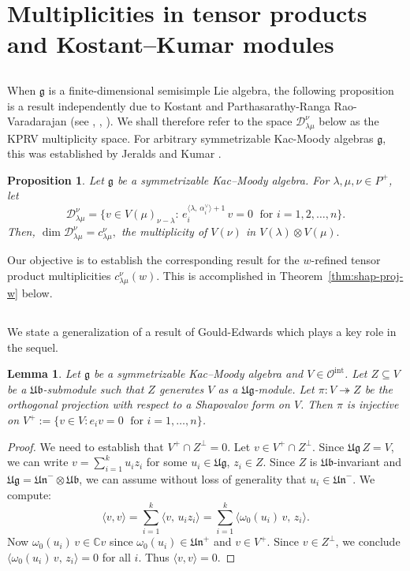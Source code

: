 \documentclass[12pt,reqno]{amsart}
\theoremstyle{plain}
\newtheorem{lemma}[theorem]{Lemma}
\newtheorem{proposition}[theorem]{Proposition}
\theoremstyle{definition}
\theoremstyle{remark}
\theoremstyle{plain}
\newcommand{\mcd}{\mathcal{D}_{\!\lambda\mu}^{\nu}}
\newcommand{\catoint}{\mathcal{O}^{\mathrm{int}}}
\newcommand{\lie}{\mathfrak}
\newcommand{\lrw}{c_{\lambda\mu}^\nu(w)}
\begin{document}
\section{Multiplicities in tensor products and Kostant--Kumar modules}\label{sec:multlrw}

\subsection{}
When $\lie g$ is a finite-dimensional semisimple Lie algebra, the following proposition is a result independently due to Kostant and Parthasarathy-Ranga Rao-Varadarajan (see \cite[\S 2.2]{PRV}, \cite[Remark 4]{kostant-tensmult}, \cite{Kum2}). We shall therefore refer to the space $\mcd$ below as the KPRV multiplicity space. For arbitrary symmetrizable Kac-Moody algebras $\lie g$, this was established by Jeralds and Kumar \cite[Proposition 4.1]{jeralds-kumar}.

\begin{proposition}\label{prop:kashi-glob}
    Let $\mathfrak{g}$ be a symmetrizable Kac--Moody algebra. For $\lambda, \mu, \nu \in P^+$,  let
    $$\mcd=\{v\in V(\mu)_{\nu-\lambda}:\, e_i^{\langle \lambda, \,\alpha_i^{\vee}\rangle +1}\,v=0 \;\text{ for } i=1,2, \ldots, n\}.$$ Then, $\dim \mcd =c_{\lambda\mu}^{\nu},$ the multiplicity of $V(\nu)$ in $V(\lambda)\otimes V(\mu).$
\end{proposition}

Our objective is to establish the corresponding result for the $w$-refined tensor product multiplicities $\lrw$. This is accomplished in Theorem~\ref{thm:shap-proj-w} below.

\subsection{}

We state a generalization of a result of Gould-Edwards \cite[Lemma 1]{GE} which plays a key role in the sequel. 
\begin{lemma}\label{lem:gould-injectivity}
Let $\mathfrak{g}$ be a symmetrizable Kac--Moody algebra and $V \in \catoint$. Let $Z \subseteq V$ be a $\lie{Ub}$-submodule such that $Z$ generates $V$ as a $\lie{Ug}$-module. Let $\pi: V \twoheadrightarrow Z$ be the orthogonal projection with respect to a Shapovalov form on $V$. Then $\pi$ is injective on $V^+:=\{v \in V: e_i v=0\; \text{ for } i=1, \ldots, n\}$. 
\end{lemma}
\begin{proof}
We need to establish that $V^+ \cap Z^\perp = 0$. Let $v \in V^+ \cap Z^\perp$. Since $\lie{Ug}\,Z = V$, we can write $v = \sum_{i=1}^k u_i z_i$ for some $u_i \in \lie{Ug}$, $z_i \in Z$. Since $Z$ is $\lie{Ub}$-invariant and $\lie{Ug} = \lie{Un}^- \otimes \lie{Ub}$, we can assume without loss of generality that $u_i \in \lie{Un}^-$. We compute:
\[ \langle v, v \rangle = \sum_{i=1}^k \langle v, \,u_i z_i \rangle = \sum_{i=1}^k \langle \omega_0(u_i) \,v, \,z_i \rangle.\]
Now $\omega_0(u_i) \,v \in \mathbb{C}v$ since $\omega_0(u_i) \in \lie{Un}^+$ and $v \in V^+$. Since $v \in Z^\perp$, we conclude $\langle \omega_0(u_i)\, v, \,z_i \rangle =0$ for all $i$. Thus $\langle v, v \rangle =0$.  
\end{proof}
\end{document}
